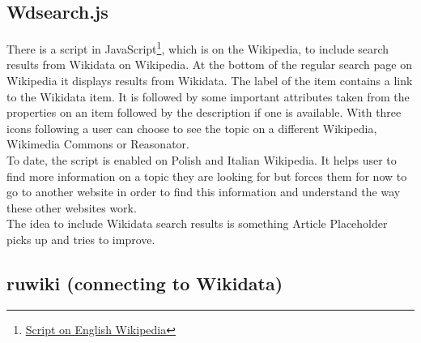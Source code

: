 \documentclass[11pt]{article}
\begin{document}
\subsection{Wdsearch.js}
There is a script in JavaScript\footnote{\href{https://en.wikipedia.org/w/index.php?title=MediaWiki:Wdsearch.js&action=raw&ctype=text/javascript}{Script on English Wikipedia}}, which is on the Wikipedia, to include search results from Wikidata on Wikipedia. At the bottom of the regular search page on Wikipedia it displays results from Wikidata. The label of the item contains a link to the Wikidata item. It is followed by some important attributes taken from the properties on an item followed by the description if one is available. With three icons following a user can choose to see the topic on a different Wikipedia, Wikimedia Commons or Reasonator. \\
To date, the script is enabled on Polish and Italian Wikipedia. It helps user to find more information on a topic they are looking for but forces them for now to go to another website in order to find this information and understand the way these other websites work. \\
The idea to include Wikidata search results is something Article Placeholder picks up and tries to improve. 

\subsection{ruwiki (connecting to Wikidata)}
\end{document}
